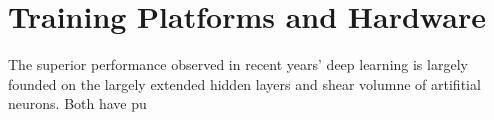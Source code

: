 \section{Training Platforms and Hardware}
The superior performance observed in recent years' deep learning is largely founded on the largely extended hidden layers and shear volumne of artifitial neurons. Both have pu